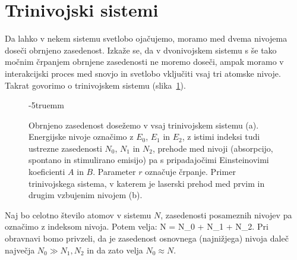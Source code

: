 \section{Trinivojski sistemi}
Da lahko v nekem sistemu svetlobo ojačujemo, moramo med 
dvema nivojema doseči obrnjeno zasedenost. Izkaže se, da v dvonivojskem 
sistemu s še tako močnim črpanjem obrnjene zasedenosti ne moremo doseči, 
ampak moramo v interakcijski proces med snovjo in svetlobo vključiti 
vsaj tri atomske nivoje. Takrat govorimo o trinivojskem sistemu 
(slika~\ref{fig:11_3nivojski}).
\begin{figure}[h!]
\centering
\def\svgwidth{100truemm} 

\caption{Obrnjeno zasedenost dosežemo v vsaj trinivojskem sistemu (a). Energijske
nivoje označimo z $E_0$, $E_1$ in $E_2$, z istimi indeksi tudi ustrezne 
zasedenosti $N_0$, $N_1$ in $N_2$, 
prehode med nivoji (absorpcijo, spontano in stimulirano emisijo) pa s pripadajočimi
Einsteinovimi koeficienti $A$ in $B$. Parameter $r$ označuje črpanje. Primer
trinivojskega sistema, v katerem je laserski prehod med prvim in drugim vzbujenim
nivojem (b).
}
\vglue-5truemm
\label{fig:11_3nivojski}
\end{figure}

Naj bo celotno število atomov v sistemu $N$, zasedenosti posameznih nivojev pa 
označimo z indeksom nivoja. Potem velja:
\beq
N = N_0 + N_1 + N_2.
\label{eq:11_32}
\eeq
Pri obravnavi bomo privzeli, da je zasedenost osnovnega (najnižjega) nivoja daleč 
največja $N_0 \gg N_1, N_2$ in da zato velja $N_0 \approx N$. 

